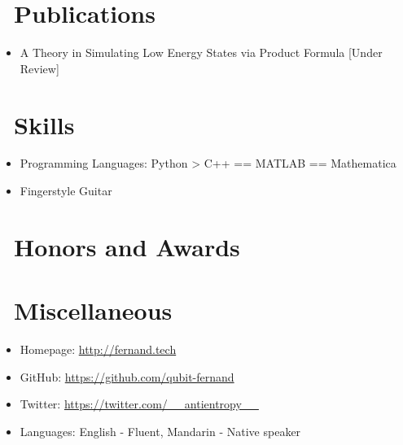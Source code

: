 \documentclass{resume}
\begin{document}
\section{\faBook\ Publications}
\begin{itemize}[parsep=0.5ex]
  \item A Theory in Simulating Low Energy States via Product Formula [Under Review]
\end{itemize}

\section{\faCogs\ Skills}
\begin{itemize}[parsep=0.5ex]
  \item Programming Languages: Python > C++ == MATLAB == Mathematica
  \item Fingerstyle Guitar
\end{itemize}

\section{\faHeartO\ Honors and Awards}
\vspace{1em}

\section{\faInfo\ Miscellaneous}
\begin{itemize}[parsep=0.5ex]
  \item Homepage: \href{http://fernand.tech}{http://fernand.tech}
  \item GitHub: \href{https://github.com/qubit-fernand}{https://github.com/qubit-fernand}
  \item Twitter: \href{https://twitter.com/__antientropy__}{https://twitter.com/\_\_antientropy\_\_}
  \item Languages: English - Fluent, Mandarin - Native speaker
\end{itemize}

%
%
\end{document}
